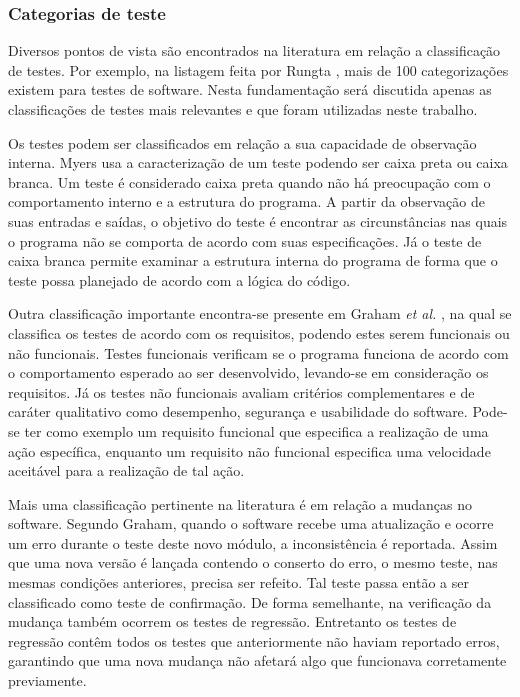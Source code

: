 \hypertarget{categorias-de-teste}{%
\subsubsection{Categorias de teste}\label{categorias-de-teste}}

Diversos pontos de vista são encontrados na literatura em relação a classificação de testes. Por exemplo, na listagem feita por Rungta \cite{rungta}, mais de 100 categorizações existem para testes de software. Nesta fundamentação será discutida apenas as classificações de testes mais relevantes e que foram utilizadas neste trabalho.

Os testes podem ser classificados em relação a sua capacidade de observação interna. Myers \cite{myers} usa a caracterização de um teste podendo ser caixa preta ou caixa branca. Um teste é considerado caixa preta quando não há preocupação com o comportamento interno e a estrutura do programa. A partir da observação de suas entradas e saídas, o objetivo do teste é encontrar as circunstâncias nas quais o programa não se comporta de acordo com suas especificações. Já o teste de caixa branca permite examinar a estrutura interna do programa de forma que o teste possa planejado de acordo com a lógica do código.

Outra classificação importante encontra-se presente em Graham \emph{et al.} \cite{graham}, na qual se classifica os testes de acordo com os requisitos, podendo estes serem funcionais ou não funcionais. Testes funcionais verificam se o programa funciona de acordo com o comportamento esperado ao ser desenvolvido, levando-se em consideração os requisitos. Já os testes não funcionais avaliam critérios complementares e de caráter qualitativo como desempenho, segurança e usabilidade do software. Pode-se ter como exemplo um requisito funcional que especifica a realização de uma ação específica, enquanto um requisito não funcional especifica uma velocidade aceitável para a realização de tal ação.

Mais uma classificação pertinente na literatura é em relação a mudanças no software. Segundo Graham, quando o software recebe uma atualização e ocorre um erro durante o teste deste novo módulo, a inconsistência é reportada. Assim que uma nova versão é lançada contendo o conserto do erro, o mesmo teste, nas mesmas condições anteriores, precisa ser refeito. Tal teste passa então a ser classificado como teste de confirmação. De forma semelhante, na verificação da mudança também ocorrem os testes de regressão. Entretanto os testes de regressão contêm todos os testes que anteriormente não haviam reportado erros, garantindo que uma nova mudança não afetará algo que funcionava corretamente previamente.

